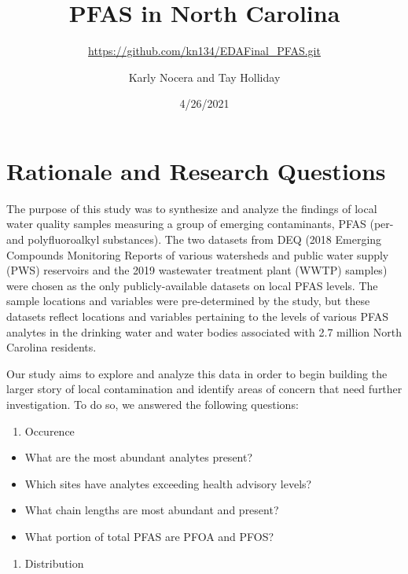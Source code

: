 \documentclass[
  12pt,
]{article}
\title{PFAS in North Carolina}
\subtitle{\url{https://github.com/kn134/EDAFinal_PFAS.git}}
\author{Karly Nocera and Tay Holliday}
\date{4/26/2021}
\providecommand{\tightlist}{%
  \setlength{\itemsep}{0pt}\setlength{\parskip}{0pt}}
\begin{document}
\maketitle

\newpage
\tableofcontents 
\newpage
\listoftables 
\newpage
\listoffigures 
\newpage

\hypertarget{rationale-and-research-questions}{%
\section{Rationale and Research
Questions}\label{rationale-and-research-questions}}

The purpose of this study was to synthesize and analyze the findings of
local water quality samples measuring a group of emerging contaminants,
PFAS (per- and polyfluoroalkyl substances). The two datasets from DEQ
(2018 Emerging Compounds Monitoring Reports of various watersheds and
public water supply (PWS) reservoirs and the 2019 wastewater treatment
plant (WWTP) samples) were chosen as the only publicly-available
datasets on local PFAS levels. The sample locations and variables were
pre-determined by the study, but these datasets reflect locations and
variables pertaining to the levels of various PFAS analytes in the
drinking water and water bodies associated with 2.7 million North
Carolina residents.

Our study aims to explore and analyze this data in order to begin
building the larger story of local contamination and identify areas of
concern that need further investigation. To do so, we answered the
following questions:

\begin{enumerate}
\def\labelenumi{\arabic{enumi}.}
\tightlist
\item
  Occurence
\end{enumerate}

\begin{itemize}
\tightlist
\item
  What are the most abundant analytes present?
\item
  Which sites have analytes exceeding health advisory levels?
\item
  What chain lengths are most abundant and present?
\item
  What portion of total PFAS are PFOA and PFOS?
\end{itemize}

\begin{enumerate}
\def\labelenumi{\arabic{enumi}.}
\setcounter{enumi}{1}
\tightlist
\item
  Distribution
\end{enumerate}
\end{document}
